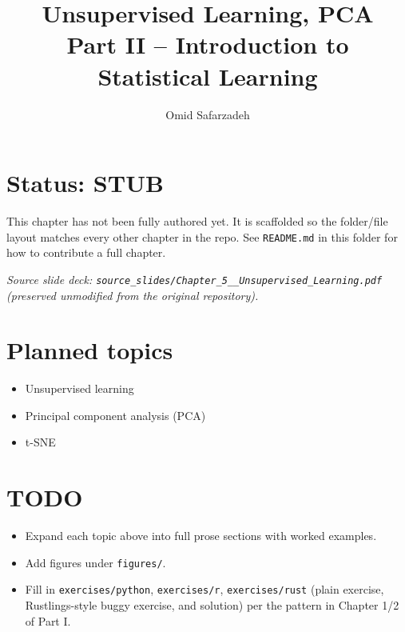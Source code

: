 \documentclass[11pt]{article}
\title{Unsupervised Learning, PCA \\ \large Part II -- Introduction to Statistical Learning}
\author{Omid Safarzadeh}
\date{}
\begin{document}
\maketitle

\section*{Status: STUB}
This chapter has not been fully authored yet. It is scaffolded so the
folder/file layout matches every other chapter in the repo. See
\texttt{README.md} in this folder for how to contribute a full chapter.

\textit{Source slide deck: \texttt{source\_slides/Chapter\_5\_\_Unsupervised\_Learning.pdf} (preserved unmodified from the original repository).}



\section*{Planned topics}
\begin{itemize}
  \item Unsupervised learning
  \item Principal component analysis (PCA)
  \item t-SNE
\end{itemize}

\section*{TODO}
\begin{itemize}
  \item Expand each topic above into full prose sections with worked examples.
  \item Add figures under \texttt{figures/}.
  \item Fill in \texttt{exercises/python}, \texttt{exercises/r}, \texttt{exercises/rust}
        (plain exercise, Rustlings-style buggy exercise, and solution) per the
        pattern in Chapter 1/2 of Part I.
\end{itemize}
\end{document}
